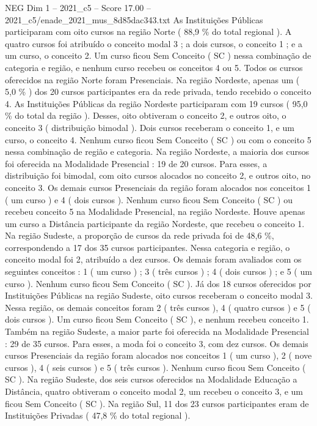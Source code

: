 \begin{textsample}{NEG Dim 1 – 2021\_c5 – Score 17.00 – 2021\_c5/enade\_2021\_mus\_8d85dac343.txt}
As Instituições Públicas participaram com oito cursos na região Norte ( 88,9 \% do total regional ).
A quatro cursos foi atribuído o conceito modal 3 ; a dois cursos, o conceito 1 ; e a um curso, o conceito 2.
Um curso ficou Sem Conceito ( SC ) nessa combinação de categoria e região, e nenhum curso recebeu os conceitos 4 ou 5.
Todos os cursos oferecidos na região Norte foram Presenciais.
Na região Nordeste, apenas um ( 5,0 \% ) dos 20 cursos participantes era da rede privada, tendo recebido o conceito 4.
As Instituições Públicas da região Nordeste participaram com 19 cursos ( 95,0 \% do total da região ).
Desses, oito obtiveram o conceito 2, e outros oito, o conceito 3 ( distribuição bimodal ).
Dois cursos receberam o conceito 1, e um curso, o conceito 4.
Nenhum curso ficou Sem Conceito ( SC ) ou com o conceito 5 nessa combinação de região e categoria.
Na região Nordeste, a maioria dos cursos foi oferecida na Modalidade Presencial : 19 de 20 cursos.
Para esses, a distribuição foi bimodal, com oito cursos alocados no conceito 2, e outros oito, no conceito 3.
Os demais cursos Presenciais da região foram alocados nos conceitos 1 ( um curso ) e 4 ( dois cursos ).
Nenhum curso ficou Sem Conceito ( SC ) ou recebeu conceito 5 na Modalidade Presencial, na região Nordeste.
Houve apenas um curso a Distância participante da região Nordeste, que recebeu o conceito 1.
Na região Sudeste, a proporção de cursos da rede privada foi de 48,6 \%, correspondendo a 17 dos 35 cursos participantes.
Nessa categoria e região, o conceito modal foi 2, atribuído a dez cursos.
Os demais foram avaliados com os seguintes conceitos : 1 ( um curso ) ; 3 ( três cursos ) ; 4 ( dois cursos ) ; e 5 ( um curso ).
Nenhum curso ficou Sem Conceito ( SC ).
Já dos 18 cursos oferecidos por Instituições Públicas na região Sudeste, oito cursos receberam o conceito modal 3.
Nessa região, os demais conceitos foram 2 ( três cursos ), 4 ( quatro cursos ) e 5 ( dois cursos ).
Um curso ficou Sem Conceito ( SC ), e nenhum recebeu conceito 1.
Também na região Sudeste, a maior parte foi oferecida na Modalidade Presencial : 29 de 35 cursos.
Para esses, a moda foi o conceito 3, com dez cursos.
Os demais cursos Presenciais da região foram alocados nos conceitos 1 ( um curso ), 2 ( nove cursos ), 4 ( seis cursos ) e 5 ( três cursos ).
Nenhum curso ficou Sem Conceito ( SC ).
Na região Sudeste, dos seis cursos oferecidos na Modalidade Educação a Distância, quatro obtiveram o conceito modal 2, um recebeu o conceito 3, e um ficou Sem Conceito ( SC ).
Na região Sul, 11 dos 23 cursos participantes eram de Instituições Privadas ( 47,8 \% do total regional ).

\end{textsample}
